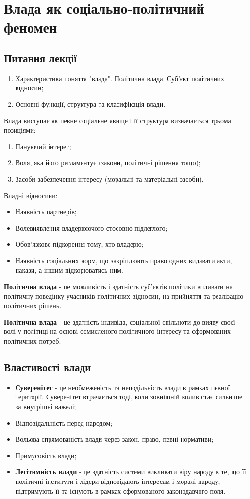 \section{Влада як соціально-політичний феномен} 
\subsection{Питання лекції}
\begin{enumerate}
\item Характеристика поняття "влада". Політична влада. Суб’єкт політичних відносин;
\item Основні функції, структура та класифікація влади.
\end{enumerate}
Влада виступає як певне соціальне явище і її структура визначається трьома позиціями:
\begin{enumerate}
\item Пануючий інтерес;
\item Воля, яка його регламентує (закони, політичні рішення тощо);
\item Засоби забезпечення інтересу (моральні та матеріальні засоби).
\end{enumerate}
Владні відносини:
\begin{itemize}
\item Наявність партнерів;
\item Волевиявлення владерюючого стосовно підлеглого;
\item Обов’язкове підкорення тому, хто владерю;
\item Наявність соціальних норм, що закріплюють право одних видавати акти, накази, а іншим підкорюватись ним.
\end{itemize}

\textbf{Політична влада} - це можливість і здатність суб’єктів політики впливати на політичну поведінку учасників політичних відносин, на прийняття та реалізацію політичних рішень. 

\textbf{Політична влада} - це здатність індивіда, соціальної спільноти до вияву своєї волі у політиці на основі осмисленого політичного інтересу та сформованих політичних потреб.

\subsection{Властивості влади}
\begin{itemize}
\item \textbf{Суверенітет} - це необмеженість та неподільність влади в рамках певної території. Суверенітет втрачається тоді, коли зовнішній вплив стає сильніше за внутрішні важелі;
\item Відповідальність перед народом;
\item Вольова спрямованість влади через закон, право, певні нормативи;
\item Примусовість влади;
\item \textbf{Легітимність влади} - це здатність системи викликати віру народу в те, що її політичні інститути і лідери відповідають інтересам і моралі народу, підтримують її та існують в рамках сформованого законодавчого поля.
\end{itemize}
